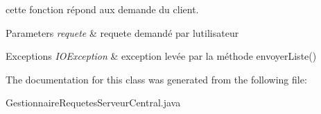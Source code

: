 cette fonction répond aux demande du client. 


\begin{DoxyParams}{Parameters}
{\em requete} & requete demandé par l\textquotesingle{}utilisateur \\
\hline
\end{DoxyParams}

\begin{DoxyExceptions}{Exceptions}
{\em I\+O\+Exception} & exception levée par la méthode envoyer\+Liste() \\
\hline
\end{DoxyExceptions}


The documentation for this class was generated from the following file\+:\begin{DoxyCompactItemize}
\item 
Gestionnaire\+Requetes\+Serveur\+Central.\+java\end{DoxyCompactItemize}
